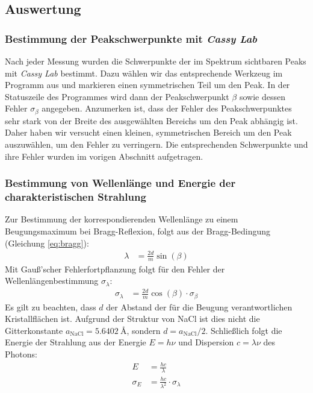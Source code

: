 \documentclass[11pt, a4paper]{article}
\begin{document}
\subsection{Auswertung}

\subsubsection{Bestimmung der Peakschwerpunkte mit \emph{Cassy Lab}}
Nach jeder Messung wurden die Schwerpunkte der im Spektrum sichtbaren Peaks mit \emph{Cassy Lab} bestimmt.
Dazu wählen wir das entsprechende Werkzeug im Programm aus und markieren einen symmetrischen Teil um den Peak.
In der Statuszeile des Programmes wird dann der Peakschwerpunkt $\beta$ sowie dessen Fehler $\sigma_\beta$ angegeben.
Anzumerken ist, dass der Fehler des Peakschwerpunktes sehr stark von der Breite des ausgewählten Bereichs um den Peak abhängig ist.
Daher haben wir versucht einen kleinen, symmetrischen Bereich um den Peak auszuwählen, um den Fehler zu verringern.
Die entsprechenden Schwerpunkte und ihre Fehler wurden im vorigen Abschnitt aufgetragen.

\subsubsection{Bestimmung von Wellenlänge und Energie der charakteristischen Strahlung}
\label{sssec:lambdaE}
Zur Bestimmung der korrespondierenden Wellenlänge zu einem Beugungsmaximum bei Bragg-Reflexion, folgt aus der Bragg-Bedingung (Gleichung \ref{eq:bragg}):
\begin{align}
  \lambda &= \frac{2d}{m} \sin(\beta)
\end{align}
Mit Gauß'scher Fehlerfortpflanzung folgt für den Fehler der Wellenlängenbestimmung $\sigma_\lambda$:
\begin{align}
  \sigma_\lambda &= \frac{2d}{m} \cos(\beta) \cdot \sigma_\beta
\end{align}
Es gilt zu beachten, dass $d$ der Abstand der für die Beugung verantwortlichen Kristallflächen ist.
Aufgrund der Struktur von NaCl ist dies nicht die Gitterkonstante $a_\mathrm{NaCl} = \SI{5,6402}{\angstrom}$\cite{crc}, sondern $d = a_\mathrm{NaCl}/2 $.
Schließlich folgt die Energie der Strahlung aus der Energie $E = h\nu$ und Dispersion $ c = \lambda \nu$ des Photons:
\begin{align}
  E &= \frac{h c}{\lambda} \\
  \sigma_E &= \frac{h c}{\lambda^2} \cdot \sigma_\lambda
\end{align}
\end{document}
